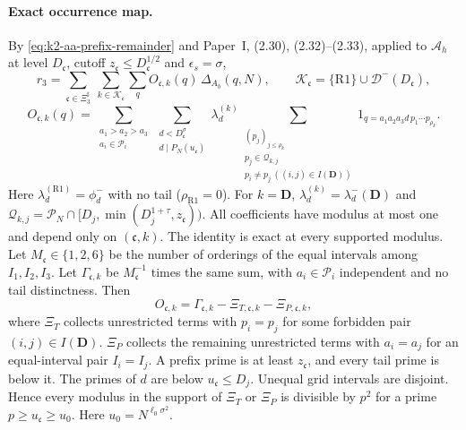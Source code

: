 \paragraph{Exact occurrence map.}
By \eqref{eq:k2-aa-prefix-remainder} and Paper~I, (2.30), (2.32)--(2.33),
applied to \(\mathcal A_h\) at level \(D_{\mathfrak c}\), cutoff
\(z_{\mathfrak c}\le D_{\mathfrak c}^{1/2}\) and \(\epsilon_s=\sigma\),
\begin{equation}\label{eq:k2-r3-occurrence}
 r_3=\sum_{\mathfrak c\in\Xi^{\sharp}_3}\ \sum_{k\in\mathcal K_{\mathfrak c}}
       \sum_qO_{\mathfrak c,k}(q)\,\Delta_{A_b}(q,N),
 \qquad \mathcal K_{\mathfrak c}=\{\mathrm{R1}\}\cup\mathcal D^-(D_{\mathfrak c}),
\end{equation}
\[
 O_{\mathfrak c,k}(q)=\sum_{\substack{a_1>a_2>a_3\\a_i\in\mathcal P_i}}
 \sum_{\substack{d<D_{\mathfrak c}^\sigma\\d\mid P_N(u_{\mathfrak c})}}
 \lambda^{(k)}_d
 \sum_{\substack{(p_j)_{j\le\rho_k}\\ p_j\in\mathcal Q_{k,j}\\
 p_i\ne p_j\ ((i,j)\in I(\mathbf D))}}
 1_{q=a_1a_2a_3d\,p_1\cdots p_{\rho_k}} .
\]
Here \(\lambda^{(\mathrm{R1})}_d=\phi_d^-\) with no tail
(\(\rho_{\mathrm{R1}}=0\)). For \(k=\mathbf D\),
\(\lambda^{(k)}_d=\lambda_d^-(\mathbf D)\) and
\(\mathcal Q_{k,j}=\mathcal P_N\cap[D_j,\min(D_j^{1+\tau},z_{\mathfrak c}))\).
All coefficients have modulus at most one and depend only on
\((\mathfrak c,k)\). The identity is exact at every supported modulus.
Let \(M_{\mathfrak c}\in\{1,2,6\}\) be the number of orderings of the
equal intervals among \(I_1,I_2,I_3\). Let \(\Gamma_{\mathfrak c,k}\)
be \(M_{\mathfrak c}^{-1}\) times the same sum, with \(a_i\in\mathcal P_i\)
independent and no tail distinctness. Then
\begin{equation}\label{eq:k2-native13-coefficient}
 O_{\mathfrak c,k}=\Gamma_{\mathfrak c,k}-\Xi_{T,\mathfrak c,k}
 -\Xi_{P,\mathfrak c,k},
\end{equation}
where \(\Xi_T\) collects unrestricted terms with
\(p_i=p_j\) for some forbidden pair \((i,j)\in I(\mathbf D)\).
\(\Xi_P\) collects the remaining unrestricted terms with
\(a_i=a_j\) for an equal-interval pair \(I_i=I_j\). A prefix prime is
at least \(z_{\mathfrak c}\), and every tail prime is below it. The primes of
\(d\) are below \(u_{\mathfrak c}\le D_j\). Unequal grid intervals are
disjoint. Hence every modulus in the support of \(\Xi_T\) or \(\Xi_P\) is
divisible by \(p^2\) for a prime \(p\ge u_{\mathfrak c}\ge u_0\). Here
\(u_0=N^{\ell_0\sigma^2}\).

